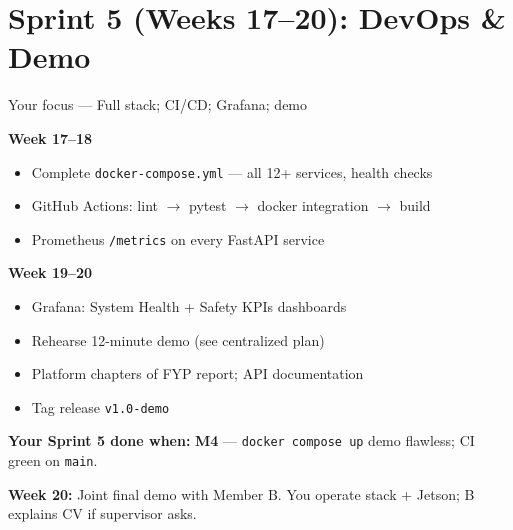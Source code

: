 \documentclass[12pt,a4paper]{article}
\begin{document}
\section{Sprint 5 (Weeks 17--20): DevOps \& Demo}

\begin{sprintbox}{{Your focus --- Full stack; CI/CD; Grafana; demo}}

\begin{taskbox}
\textbf{Week 17--18}
\begin{itemize}
    \item Complete \texttt{docker-compose.yml} --- all 12+ services, health checks
    \item GitHub Actions: lint $\rightarrow$ pytest $\rightarrow$ docker integration $\rightarrow$ build
    \item Prometheus \texttt{/metrics} on every FastAPI service
\end{itemize}
\end{taskbox}

\begin{taskbox}
\textbf{Week 19--20}
\begin{itemize}
    \item Grafana: System Health + Safety KPIs dashboards
    \item Rehearse 12-minute demo (see centralized plan)
    \item Platform chapters of FYP report; API documentation
    \item Tag release \texttt{v1.0-demo}
\end{itemize}
\end{taskbox}

\begin{deliverablebox}
\textbf{Your Sprint 5 done when:} \textbf{M4} --- \texttt{docker compose up} demo flawless; CI green on \texttt{main}.
\end{deliverablebox}

\begin{collabbox}
\textbf{Week 20:} Joint final demo with Member B. You operate stack + Jetson; B explains CV if supervisor asks.
\end{collabbox}

\end{sprintbox}

\end{document}
